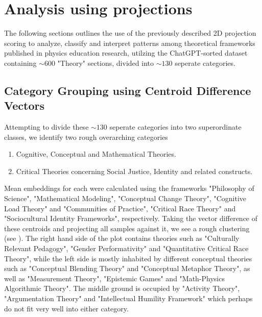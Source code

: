 \section{Analysis using projections}
The following sections outlines the use of the previously described 2D projection scoring to analyze, classify and interpret patterns among theoretical frameworks published in physics education research, utilzing the ChatGPT-sorted dataset containing $\sim$600 "Theory" sections, divided into $\sim130$ seperate categories.

\subsection{Category Grouping using Centroid Difference Vectors}
\noindent Attempting to divide these $\sim130$ seperate categories into two superordinate classes, we identify two rough overarching categories
\begin{enumerate}
    \item Cognitive, Conceptual and Mathematical Theories.
    \item Critical Theories concerning Social Justice, Identity and related constructs.
\end{enumerate}
Mean embeddings for each were calculated using the frameworks "Philosophy of Science", "Mathematical Modeling", "Conceptual Change Theory", "Cognitive Load Theory" and "Communities of Practice", "Critical Race Theory" and "Sociocultural Identity Frameworks", respectively. Taking the vector difference of these centroids and projecting all samples against it, we see a rough clustering (see ). The right hand side of the plot contains theories such as "Culturally Relevant Pedagogy", "Gender Performativity" and "Quantitative Critical Race Theory", while the left side is mostly inhabited by different conceptual theories such as "Conceptual Blending Theory" and "Conceptual Metaphor Theory", as well as "Measurement Theory", "Epistemic Games" and "Math-Physics Algorithmic Theory". The middle ground is occupied by "Activity Theory", "Argumentation Theory" and "Intellectual Humility Framework" which perhaps do not fit very well into either category.

